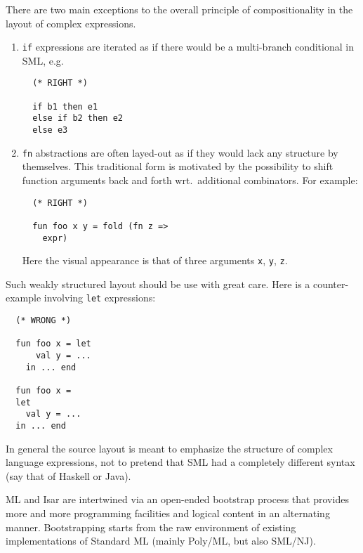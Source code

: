 \begin{isabellebody}
\begin{isamarkuptext}
  \medskip There are two main exceptions to the overall principle of
  compositionality in the layout of complex expressions.

  \begin{enumerate}

  \item \verb|if| expressions are iterated as if there would be
  a multi-branch conditional in SML, e.g.

  \begin{verbatim}
  (* RIGHT *)

  if b1 then e1
  else if b2 then e2
  else e3
  \end{verbatim}

  \item \verb|fn| abstractions are often layed-out as if they
  would lack any structure by themselves.  This traditional form is
  motivated by the possibility to shift function arguments back and
  forth wrt.\ additional combinators.  For example:

  \begin{verbatim}
  (* RIGHT *)

  fun foo x y = fold (fn z =>
    expr)
  \end{verbatim}

  Here the visual appearance is that of three arguments \verb|x|,
  \verb|y|, \verb|z|.

  \end{enumerate}

  Such weakly structured layout should be use with great care.  Here
  is a counter-example involving \verb|let| expressions:

  \begin{verbatim}
  (* WRONG *)

  fun foo x = let
      val y = ...
    in ... end

  fun foo x =
  let
    val y = ...
  in ... end
  \end{verbatim}

  \medskip In general the source layout is meant to emphasize the
  structure of complex language expressions, not to pretend that SML
  had a completely different syntax (say that of Haskell or Java).%
\end{isamarkuptext}%
\isamarkuptrue%
%
\isamarkuptrue%
%
\begin{isamarkuptext}%
ML and Isar are intertwined via an open-ended bootstrap
  process that provides more and more programming facilities and
  logical content in an alternating manner.  Bootstrapping starts from
  the raw environment of existing implementations of Standard ML
  (mainly Poly/ML, but also SML/NJ).


\end{isamarkuptext}
\end{isabellebody}
